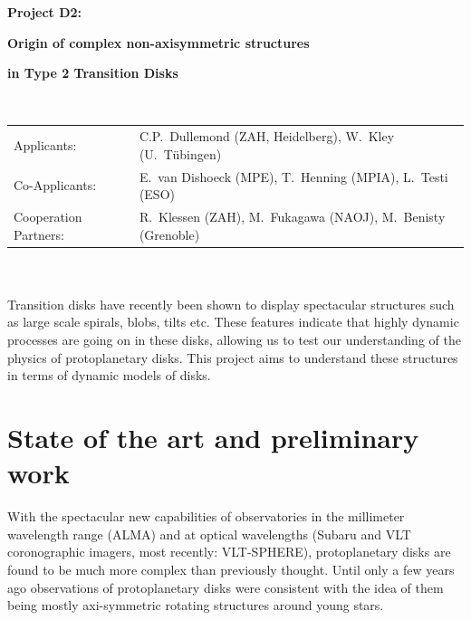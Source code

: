 \documentclass[10pt,fleqn,twoside]{article}
\begin{document}
\newpage


\setcounter{page}{159}

\centerline{\huge\bf\Tcol
%
%
%
%
%
 Project D2:}
\vspace{1em}

\centerline{\LARGE\bf\Tcol Origin of complex non-axisymmetric structures}\vspace{0.3em}
\centerline{\LARGE\bf\Tcol in Type 2 Transition Disks}

%
%
%
%
%
\vskip1.0cm


\\
\begin{tabular}{ll}
{\textsf{Applicants:}}              & C.P.~Dullemond (ZAH, Heidelberg), W.~Kley (U.~T\"ubingen)\\
{\textsf{Co-Applicants:}}           & E.~van Dishoeck (MPE), T.~Henning (MPIA), L.~Testi (ESO)\\
{\textsf{Cooperation Partners:}}    & R.~Klessen (ZAH), M.~Fukagawa (NAOJ), M.~Benisty (Grenoble)\\
\end{tabular}


\vspace{1em}
 \\

\vspace{1em}
\\
Transition disks have recently been shown to display spectacular structures
such as large scale spirals, blobs, tilts etc. These features indicate that
highly dynamic processes are going on in these disks, allowing us to test
our understanding of the physics of protoplanetary disks. This project aims
to understand these structures in terms of dynamic models of disks.


\section{State of the art and preliminary work}
\renewcommand{\leftmark}{\sc State of the Art and preliminary work}
With the spectacular new capabilities of observatories in the millimeter
wavelength range (ALMA) and at optical wavelengths (Subaru and VLT
coronographic imagers, most recently: VLT-SPHERE), protoplanetary disks are
found to be much more complex than previously thought. Until only a few
years ago observations of protoplanetary disks were consistent with the idea
of them being mostly axi-symmetric rotating structures around young stars.  
\end{document}
